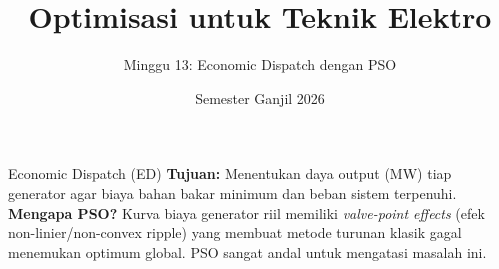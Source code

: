 \documentclass[aspectratio=169]{beamer}
\title{Optimisasi untuk Teknik Elektro}\subtitle{Minggu 13: Economic Dispatch dengan PSO}
\date{Semester Ganjil 2026}
\begin{document}
\begin{frame}\titlepage\end{frame}
\begin{frame}{Economic Dispatch (ED)}
\textbf{Tujuan:} Menentukan daya output (MW) tiap generator agar biaya bahan bakar minimum dan beban sistem terpenuhi.
\textbf{Mengapa PSO?} Kurva biaya generator riil memiliki \textit{valve-point effects} (efek non-linier/non-convex ripple) yang membuat metode turunan klasik gagal menemukan optimum global. PSO sangat andal untuk mengatasi masalah ini.
\end{frame}
\end{document}
